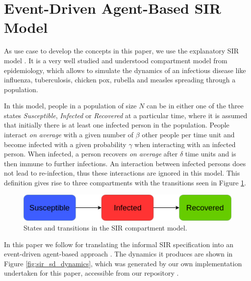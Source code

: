 \section{Event-Driven Agent-Based SIR Model}
\label{sec:sirmodel}
As use case to develop the concepts in this paper, we use the explanatory SIR model \cite{kermack_contribution_1927}. It is a very well studied and understood compartment model from epidemiology, which allows to simulate the dynamics of an infectious disease like influenza, tuberculosis, chicken pox, rubella and measles spreading through a population. 

In this model, people in a population of size $N$ can be in either one of the three states \textit{Susceptible}, \textit{Infected} or \textit{Recovered} at a particular time, where it is assumed that initially there is at least one infected person in the population. People interact \textit{on average} with a given number of $\beta$ other people per time unit and become infected with a given probability $\gamma$ when interacting with an infected person. When infected, a person recovers \textit{on average} after $\delta$ time units and is then immune to further infections. An interaction between infected persons does not lead to re-infection, thus these interactions are ignored in this model. This definition gives rise to three compartments with the transitions seen in Figure \ref{fig:sir_transitions}.

\begin{figure}
	\centering
	\includegraphics[width=.5\textwidth, angle=0]{./fig1.png}
	\caption{States and transitions in the SIR compartment model.}
	\label{fig:sir_transitions}
\end{figure}

In this paper we follow \cite{macal_agent-based_2010} for translating the informal SIR specification into an event-driven agent-based approach \cite{meyer_event-driven_2014}. The dynamics it produces are shown in Figure \ref{fig:sir_sd_dynamics}, which was generated by our own implementation undertaken for this paper, accessible from our repository \cite{thaler_repository_2019}.

